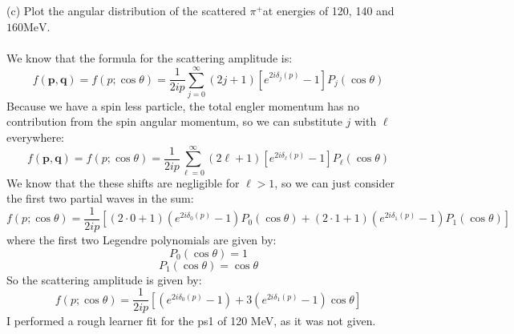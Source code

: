 \documentclass[12pt]{article}
\begin{document}
\subsection{}
(c) Plot the angular distribution of the scattered $\pi^{+}$at energies of 120, 140 and $160 \mathrm{MeV}$.\\\\
We know that the formula for the scattering amplitude is:
\begin{equation}
f(\mathbf{p}, \mathbf{q})=f(p ; \cos \theta)=\frac{1}{2 i p} \sum_{j=0}^{\infty}(2 j+1)\left[e^{2 i \delta_j(p)}-1\right] P_j(\cos \theta)
\end{equation}
Because we have a spin less particle, the total engler momentum has no contribution from the spin angular momentum, so we can substitute $j$ with $\ell$ everywhere:
\begin{equation}
f(\mathbf{p}, \mathbf{q})=f(p ; \cos \theta)=\frac{1}{2 i p} \sum_{\ell=0}^{\infty}(2 \ell+1)\left[e^{2 i \delta_{\ell}(p)}-1\right] P_{\ell}(\cos \theta)
\end{equation}
We know that the these shifts are negligible for $\ell > 1$, so we can just consider the first two partial waves in the sum:
\begin{equation}
f(p ; \cos \theta)=\frac{1}{2 i p} \left[(2 \cdot 0+1)\left(e^{2 i \delta_{0}(p)}-1\right) P_{0}(\cos \theta) + (2 \cdot 1+1)\left(e^{2 i \delta_{1}(p)}-1\right) P_{1}(\cos \theta)\right]
\end{equation}
where the first two Legendre polynomials are given by:
\begin{equation}
P_0(\cos \theta) = 1
\end{equation}
\begin{equation}
P_1(\cos \theta) = \cos \theta
\end{equation}
So the scattering amplitude is given by:
\begin{equation}
f(p ; \cos \theta)=\frac{1}{2 i p} \left[\left(e^{2 i \delta_{0}(p)}-1\right) + 3\left(e^{2 i \delta_{1}(p)}-1\right) \cos \theta\right]
\end{equation}
I performed a rough learner fit for the ps1 of 120 MeV, as it was not given.
\end{document}
